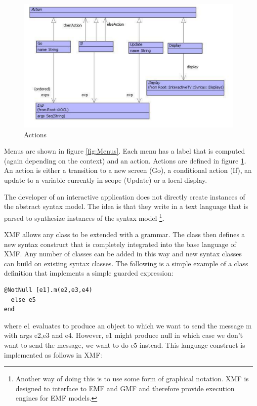 %
\begin{figure}[htb]
\begin{center}
\includegraphics[scale=0.75]{CaseStudy4/figures/Actions.pdf}

\caption{Actions\label{fig:Actions}}
\end{center}
\end{figure}


Menus are shown in figure \ref{fig:Menus}. Each menu has a label
that is computed (again depending on the context) and an action. Actions
are defined in figure \ref{fig:Actions}. An action is either a transition
to a new screen (Go), a conditional action (If), an update to a variable
currently in scope (Update) or a local display.

The developer of an interactive application does not directly create
instances of the abstract syntax model. The idea is that they write
in a text language that is parsed to synthesize instances of the syntax
model%
\footnote{Another way of doing this is to use some form of graphical notation.
XMF is designed to interface to EMF \cite{emf}and GMF \cite{gmf}and
therefore provide execution engines for EMF models. %
}.

XMF allows any class to be extended with a grammar. The class then
defines a new syntax construct that is completely integrated into
the base language of XMF. Any number of classes can be added in this
way and new syntax classes can build on existing syntax classes. The
following is a simple example of a class definition that implements
a simple guarded expression:

\begin{lstlisting}
@NotNull [e1].m(e2,e3,e4)
  else e5
end
\end{lstlisting}where e1 evaluates to produce an object to which we want to send the
message m with args e2,e3 and e4. However, e1 might produce null in
which case we don't want to send the message, we want to do e5 instead.
This language construct is implemented as follows in XMF:

